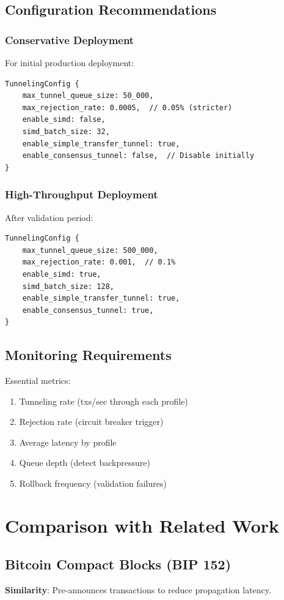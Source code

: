 \documentclass[11pt,a4paper]{article}
\begin{document}
\subsection{Configuration Recommendations}

\subsubsection{Conservative Deployment}
For initial production deployment:
\begin{lstlisting}
TunnelingConfig {
    max_tunnel_queue_size: 50_000,
    max_rejection_rate: 0.0005,  // 0.05% (stricter)
    enable_simd: false,
    simd_batch_size: 32,
    enable_simple_transfer_tunnel: true,
    enable_consensus_tunnel: false,  // Disable initially
}
\end{lstlisting}

\subsubsection{High-Throughput Deployment}
After validation period:
\begin{lstlisting}
TunnelingConfig {
    max_tunnel_queue_size: 500_000,
    max_rejection_rate: 0.001,  // 0.1%
    enable_simd: true,
    simd_batch_size: 128,
    enable_simple_transfer_tunnel: true,
    enable_consensus_tunnel: true,
}
\end{lstlisting}

\subsection{Monitoring Requirements}

Essential metrics:
\begin{enumerate}
    \item Tunneling rate (txs/sec through each profile)
    \item Rejection rate (circuit breaker trigger)
    \item Average latency by profile
    \item Queue depth (detect backpressure)
    \item Rollback frequency (validation failures)
\end{enumerate}

\section{Comparison with Related Work}

\subsection{Bitcoin Compact Blocks (BIP 152)}
\textbf{Similarity}: Pre-announces transactions to reduce propagation latency.
\end{document}
